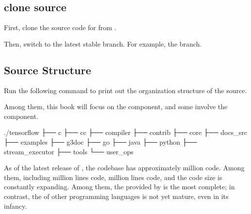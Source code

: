 \begin{content}

\subsection{clone source}

First, clone the source code for \tf{} from .



Then, switch to the latest stable branch. For example, the  branch.


\subsection{Source Structure}

Run the following command to print out the organization structure of the \tf{} source.


Among them, this book will focus on the  component, and some involve the  component.

\begin{leftbar}
\begin{c++}[caption={TensorFlowSource Structure}]
./tensorflow
├── c
├── cc
├── compiler
├── contrib
├── core
├── docs_src
├── examples
├── g3doc
├── go
├── java
├── python
├── stream_executor
├── tools
└── user_ops
\end{c++}
\end{leftbar}

As of the latest release of , the \tf{} codebase has approximately  million code. Among them, including  million lines code,  million lines code, and the code size is constantly expanding. Among them, the  provided by  is the most complete; in contrast, the  of other programming languages ​​is not yet mature, even in its infancy.


\end{content}
